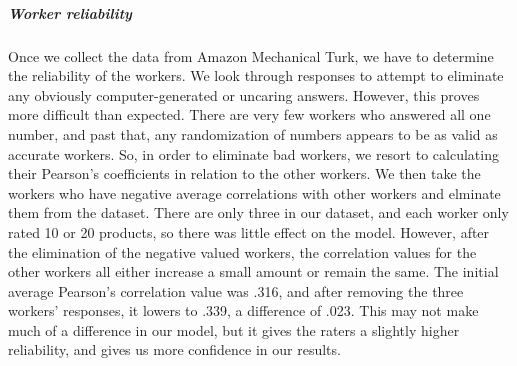 \documentclass[dvips,12pt]{article}
\begin{document}
\subparagraph{Worker reliability} \label{reliability}
Once we collect the data from Amazon Mechanical Turk, we have to determine the reliability of the workers. We look through responses to attempt to eliminate any obviously computer-generated or uncaring answers. However, this proves more difficult than expected. There are very few workers who answered all one number, and past that, any randomization of numbers appears to be as valid as accurate workers. So, in order to eliminate bad workers, we resort to calculating their Pearson’s coefficients in relation to the other workers. We then take the workers who have negative average correlations with other workers and elminate them from the dataset. There are only three in our dataset, and each worker only rated 10 or 20 products, so there was little effect on the model. However, after the elimination of the negative valued workers, the correlation values for the other workers all either increase a small amount or remain the same. The initial average Pearson’s correlation value was .316, and after removing the three workers’ responses, it lowers to .339, a difference of .023. This may not make much of a difference in our model, but it gives the raters a slightly higher reliability, and gives us more confidence in our results.
\end{document}
